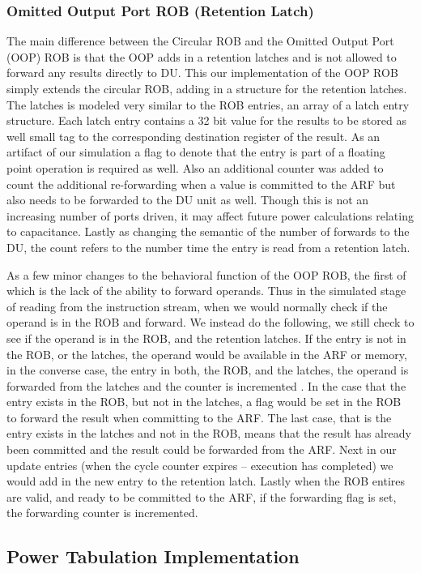 \subsubsection{Omitted Output Port ROB (Retention Latch)}
The main difference between the Circular ROB and the Omitted Output Port (OOP) ROB is that the OOP adds in a retention latches and is not allowed to forward any results directly to DU.  
This our implementation of the OOP ROB simply extends the circular ROB, adding in a structure for the retention latches.  The latches is modeled very similar to the ROB entries, an array
of a latch entry structure.  Each latch entry contains a 32 bit value for the results to be stored as well small tag to the corresponding destination register of the result.  As an artifact of our 
simulation a flag to denote that the entry is part of a floating point operation is required as well.  Also an additional counter was added to count the additional re-forwarding when a value
is committed to the ARF but also needs to be forwarded to the DU unit as well.  Though this is not an increasing number of ports driven, it may affect future power calculations relating to 
capacitance.  Lastly as changing the semantic of the number of forwards to the DU, the count refers to the number time the entry is read from a retention latch.

As a few minor changes to the behavioral function of the OOP ROB, the first of which is the lack of the ability to forward operands.  Thus in the simulated stage of reading from the instruction
stream, when we would normally check if the operand is in the ROB and forward.  We instead do the following, we still check to see if the operand is in the ROB, and the retention latches. 
If the entry is not in the ROB, or the latches, the operand would be available in the ARF or memory, in the converse case,  the entry in both, the ROB, and the latches, the operand is forwarded
from the latches and the counter is incremented .  In the case that the entry exists in the ROB, but not in the latches, a flag would be set in the ROB to forward the result when committing to the ARF. 
The last case, that is the entry exists in the latches and not in the ROB, means that the result has already been committed and the result could be forwarded from the ARF.  Next in our update entries 
(when the cycle counter expires -- execution has completed) we would add in the new entry to the retention latch.  Lastly when the ROB entires are valid, and ready to be committed to the ARF,
if the forwarding flag is set, the forwarding counter is incremented.
\subsection{Power Tabulation Implementation}

